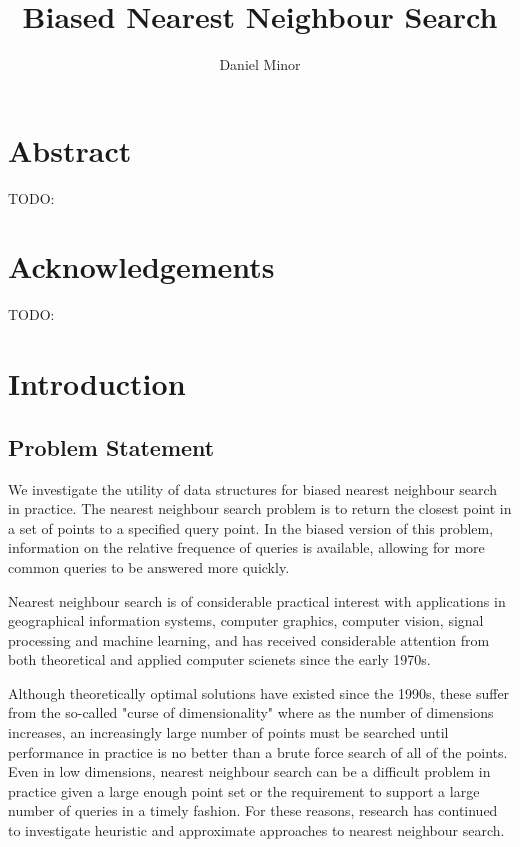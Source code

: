 \documentclass[mcs]{scsthesis}
\title {Biased Nearest Neighbour Search}
\author {Daniel Minor}
\begin{document}
\newtheorem*{thm}{Theorem}[section]

\beforepreface

\prefacesection

\chapter*{Abstract}

TODO:

\chapter*{Acknowledgements}

TODO:

\afterpreface

\chapter{Introduction}

\section{Problem Statement}

We investigate the utility of data structures for biased nearest neighbour
search in practice. The nearest neighbour search problem is to return the
closest point in a set of points to a specified query point. In the biased
version of this problem, information on the relative frequence of queries
is available, allowing for more common queries to be answered more quickly.

Nearest neighbour search is of considerable practical interest with
applications in geographical information systems, computer graphics,
computer vision, signal processing and machine learning, and has received
considerable attention from both theoretical and applied computer scienets
since the early 1970s.

Although theoretically optimal solutions have existed since the 1990s, these
suffer from the so-called "curse of dimensionality" where as the number of
dimensions increases, an increasingly large number of points must be searched
until performance in practice is no better than a brute force search of all of
the points. Even in low dimensions, nearest neighbour search can be a difficult
problem in practice given a large enough point set or the requirement to support
a large number of queries in a timely fashion. For these reasons, research has
continued to investigate heuristic and approximate approaches to nearest
neighbour search. 
 
\end{document}
